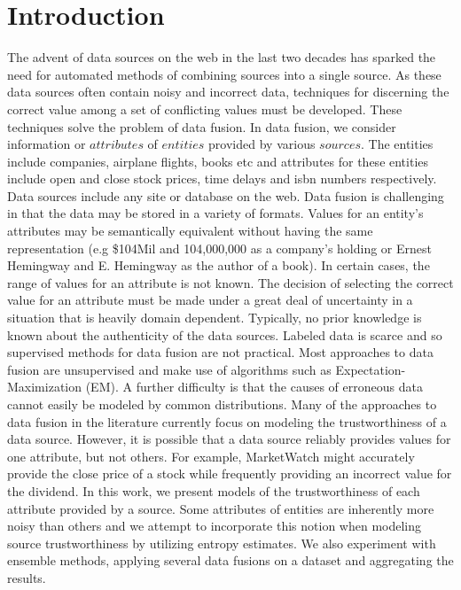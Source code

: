 \documentclass{acm_proc_article-sp}
\begin{document}
\maketitle





\section{Introduction}

The advent of data sources on the web in the last two decades has sparked the need for automated methods of combining sources into a single source. As these data sources often contain noisy and incorrect data, techniques for discerning the correct value among a set of conflicting values must be developed. These techniques solve the problem of data fusion. In data fusion, we consider information or $attributes$ of $entities$ provided by various $sources$. The entities include companies, airplane flights, books etc and attributes for these entities include open and close stock prices, time delays and isbn numbers respectively. Data sources include any site or database on the web. Data fusion is challenging in that the data may be stored in a variety of formats. Values for an entity's attributes may be semantically equivalent without having the same representation (e.g \$104Mil and 104,000,000 as a company's holding or Ernest Hemingway and E. Hemingway as the author of a book). In certain cases, the range of values for an attribute is not known. The decision of selecting the correct value for an attribute must be made under a great deal of uncertainty in a situation that is heavily domain dependent. Typically, no prior knowledge is known about the authenticity of the data sources. Labeled data is scarce and so supervised methods for data fusion are not practical. Most approaches to data fusion are unsupervised and make use of algorithms such as Expectation-Maximization (EM). A further difficulty is that the causes of erroneous data cannot easily be modeled by common distributions. Many of the approaches to data fusion in the literature currently focus on modeling the trustworthiness of a data source. However, it is possible that a data source reliably provides values for one attribute, but not others. For example, MarketWatch might accurately provide the close price of a stock while frequently providing an incorrect value for the dividend. In this work, we present models of the trustworthiness of each attribute provided by a source. Some attributes of entities are inherently more noisy than others and we attempt to incorporate this notion when modeling source trustworthiness by utilizing entropy estimates. We also experiment with ensemble methods, applying several data fusions on a dataset and aggregating the results. 
\end{document}
